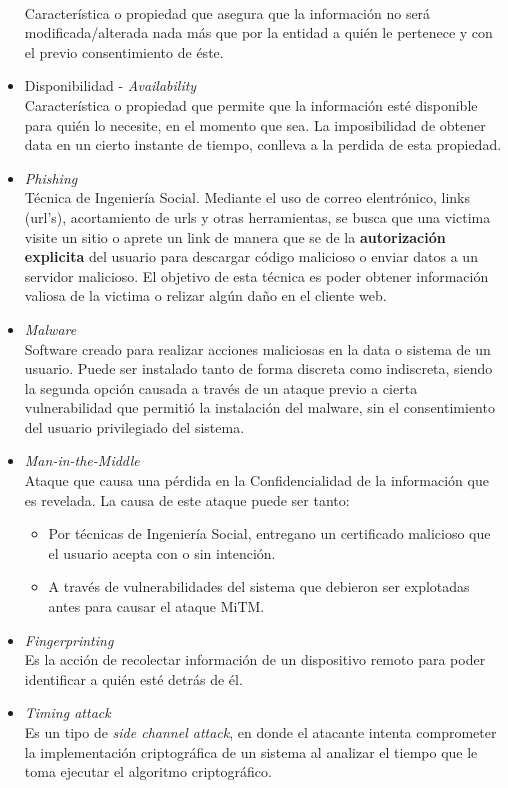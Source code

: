 \begin{itemize}
        \\Característica o propiedad que asegura que la información no será modificada/alterada nada más que por la entidad a quién le pertenece y con el previo consentimiento de éste.
    \item Disponibilidad - \textit{Availability}
        \\Característica o propiedad que permite que la información esté disponible para quién lo necesite, en el momento que sea. La imposibilidad de obtener data en un cierto instante de tiempo, conlleva a la perdida de esta propiedad.
    \item \textit{Phishing}
        \\Técnica de Ingeniería Social. Mediante el uso de correo elentrónico, links (url's), acortamiento de urls y otras herramientas, se busca que una victima visite un sitio o aprete un link de manera que se de la \textbf{autorización explicita} del usuario para descargar código malicioso o enviar datos a un servidor malicioso. El objetivo de esta técnica es poder obtener información valiosa de la victima o relizar algún daño en el cliente web.
    \item \textit{Malware}
        \\Software creado para realizar acciones maliciosas en la data o sistema de un usuario. Puede ser instalado tanto de forma discreta como indiscreta, siendo la segunda opción causada a través de un ataque previo a cierta vulnerabilidad que permitió la instalación del malware, sin el consentimiento del usuario privilegiado del sistema.
    \item \textit{Man-in-the-Middle}
        \\Ataque que causa una pérdida en la Confidencialidad de la información que es revelada. La causa de este ataque puede ser tanto:
            \begin{itemize}
                \item Por técnicas de Ingeniería Social, entregano un certificado malicioso que el usuario acepta con o sin intención.
                \item A través de vulnerabilidades del sistema que debieron ser explotadas antes para causar el ataque MiTM.
            \end{itemize}
    \item \textit{Fingerprinting}
        \\Es la acción de recolectar información de un dispositivo remoto para poder identificar a quién esté detrás de él.
    \item \textit{Timing attack}
        \\Es un tipo de \textit{side channel attack}, en donde el atacante intenta comprometer la implementación criptográfica de un sistema al analizar el tiempo que le toma ejecutar el algoritmo criptográfico.
\end{itemize}


